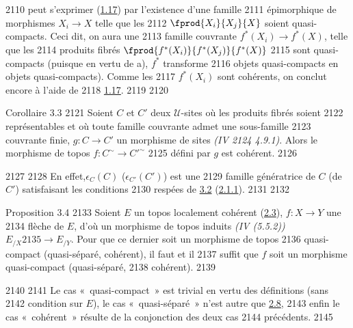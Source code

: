   2110	peut s'exprimer (\hyperref[VI.cor1.17]{1.17}) par l'existence d'une famille
  2111	épimorphique de morphismes $X_i \to X$ telle que les
  2112	$\fprod{X_i}{X_j}{X}$ soient quasi-compacts. Ceci dit, on aura une
  2113	famille couvrante $f^{\ast}(X_i) \to f^{\ast}(X)$, telle que les
  2114	produits fibrés $\fprod{f^{\ast}(X_i)}{f^{\ast}(X_j)}{f^{\ast}(X)}$
  2115	sont quasi-compacts (puisque en vertu de a), $f^{\ast}$ transforme
  2116	objets quasi-compacts en objets quasi-compacts). Comme les
  2117	$f^{\ast}(X_i)$ sont cohérents, on conclut encore à l'aide de
  2118	\hyperref[VI.cor1.17]{1.17}.
  2119	
  2120	\begin{enonce*}{Corollaire 3.3}
  2121	Soient $C$ et $C'$ deux $𝒰$-sites où les produits fibrés soient
  2122	représentables et où toute famille couvrante admet une sous-famille
  2123	couvrante finie, $g : C \to C'$ un morphisme de sites \emph{(IV
  2124	4.9.1)}. Alors le morphisme de topos $f: C^{\sim} \to {C'}^{\sim}$
  2125	défini par $g$ est cohérent.
  2126	\end{enonce*}
  2127	
  2128	En effet,\pageoriginale $\epsilon_C(C)$ (\resp $\epsilon_{C'}(C')$) est une
  2129	famille génératrice de $C$ (\resp de $C'$) satisfaisant les conditions
  2130	respées de \hyperref[VI.prop3.2]{3.2} (\hyperref[VI.cor2.1.1]{2.1.1}).
  2131	
  2132	\begin{enonce*}{Proposition 3.4}
  2133	Soient $E$ un topos localement cohérent (\hyperref[VI.def2.3]{2.3}), $f:X \to Y$ une
  2134	flèche de $E$, d'où un morphisme de topos induits \emph{(IV (5.5.2))} $E_{/X}
  2135	\to E_{/Y}$. Pour que ce dernier soit un morphisme de topos
  2136	quasi-compact (\resp quasi-séparé, \resp cohérent), il faut et il
  2137	suffit que $f$ soit un morphisme quasi-compact (\resp quasi-séparé,
  2138	\resp cohérent).
  2139	\end{enonce*}
  2140	
  2141	Le cas « quasi-compact » est trivial en vertu des définitions (sans
  2142	condition sur $E$), le cas « quasi-séparé » n'est autre que \hyperref[VI.cor2.8]{2.8},
  2143	enfin le cas « cohérent » résulte de la conjonction des deux cas
  2144	précédents.
  2145	
